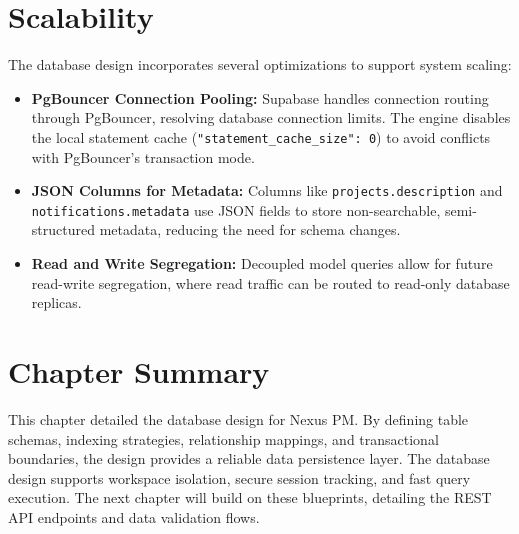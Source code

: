 \section{Scalability}
The database design incorporates several optimizations to support system scaling:
\begin{itemize}
    \item \textbf{PgBouncer Connection Pooling:} Supabase handles connection routing through PgBouncer, resolving database connection limits. The engine disables the local statement cache (\texttt{"statement\_cache\_size": 0}) to avoid conflicts with PgBouncer's transaction mode.
    \item \textbf{JSON Columns for Metadata:} Columns like \texttt{projects.description} and \texttt{notifications.metadata} use JSON fields to store non-searchable, semi-structured metadata, reducing the need for schema changes.
    \item \textbf{Read and Write Segregation:} Decoupled model queries allow for future read-write segregation, where read traffic can be routed to read-only database replicas.
\end{itemize}

\section{Chapter Summary}
This chapter detailed the database design for Nexus PM. By defining table schemas, indexing strategies, relationship mappings, and transactional boundaries, the design provides a reliable data persistence layer. The database design supports workspace isolation, secure session tracking, and fast query execution. The next chapter will build on these blueprints, detailing the REST API endpoints and data validation flows.
